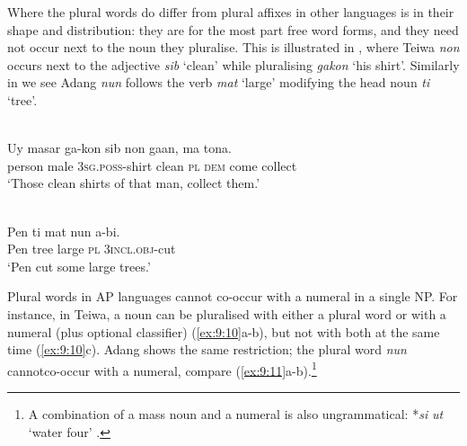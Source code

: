 




Where the plural words do differ from plural affixes in other languages is in their shape and distribution: they are for the most part free word forms, and they need not occur next to the noun they pluralise. This is illustrated in , where Teiwa \textit{non} occurs next to the adjective \textit{sib} `clean' while pluralising \textit{gakon} `his shirt'. Similarly in  we see Adang \textit{nun} follows the verb \textit{mat}\textit{{\textepsilon}} `large' modifying the head noun \textit{ti} `tree'.


\ea%
 \\
\label{ex:9:8}
\gll  Uy masar ga-kon  sib non ga{{\textglotstop}}{an,} ma {tona}{{\textglotstop}}{.}\\
   person male \textsc{3sg.poss}-shirt clean \textsc{pl} \textsc{dem} come collect\\
\glt `Those clean shirts of that man, collect them.'
\z







\ea%
 \\
\label{ex:9:9}
\gll Pen ti {mat}{{\textepsilon}} nun {\textglotstop}a-b{{\textopeno}}{{\textglotstop}}{{\textopeno}}{i.} \\
   Pen tree large \textsc{pl} \textsc{3incl.obj}-cut \\
\glt `Pen cut some large trees.'
\z






Plural words in AP languages cannot co-occur with a numeral in a single NP. For instance, in Teiwa, a noun can be pluralised with either a plural word or with a numeral (plus optional classifier) (\ref{ex:9:10}a-b), but not with both at the same time (\ref{ex:9:10}c). Adang shows the same restriction; the plural word \textit{nun} cannotco-occur with a numeral, compare (\ref{ex:9:11}a-b).\footnote{A combination of a mass noun and a numeral is also ungrammatical: *\textit{s}\textit{{\textepsilon}}\textit{i} \textit{ut} `water four' \citep[296]{Haan2001}.}


